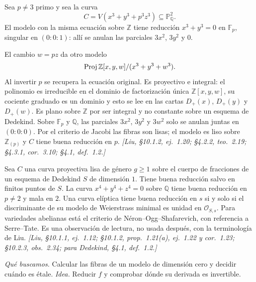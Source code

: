 \begin{ejem}
\label{ejem:s09-modelos-cubica}
Sea $p\ne3$ primo y sea la curva
\[
C=V(x^3+y^3+p^3z^3)\subseteq\mathbb P^2_{\mathbb Q}.
\]
El modelo con la misma ecuación sobre $\mathbb Z$ tiene reducción $x^3+y^3=0$ en $\mathbb F_p$, singular en $(0:0:1)$: allí se anulan las parciales $3x^2$, $3y^2$ y $0$.

El cambio $w=pz$ da otro modelo
\[
\operatorname{Proj}\mathbb Z[x,y,w]/(x^3+y^3+w^3).
\]
Al invertir $p$ se recupera la ecuación original. Es proyectivo e integral: el polinomio es irreducible en el dominio de factorización única $\mathbb Z[x,y,w]$, su cociente graduado es un dominio y esto se lee en las cartas $D_+(x)$, $D_+(y)$ y $D_+(w)$. Es plano sobre $\mathbb Z$ por ser integral y no constante sobre un esquema de Dedekind. Sobre $\mathbb F_p$ y $\mathbb Q$, las parciales $3x^2$, $3y^2$ y $3w^2$ solo se anulan juntas en $(0:0:0)$. Por el criterio de Jacobi las fibras son lisas; el modelo es liso sobre $\mathbb Z_{(p)}$ y $C$ tiene buena reducción en $p$. \emph{[Liu, \S10.1.2, ej.~1.20; \S4.2.2, teo.~2.19; \S4.3.1, cor.~3.10; \S4.1, def.~1.2.]}
\end{ejem}

\begin{obs}
\label{obs:s09-resultados-liu}
Sea $C$ una curva proyectiva lisa de género $g\ge1$ sobre el cuerpo de fracciones de un esquema de Dedekind $S$ de dimensión $1$. Tiene buena reducción salvo en finitos puntos de $S$. La curva $x^4+y^4+z^4=0$ sobre $\mathbb Q$ tiene buena reducción en $p\ne2$ y mala en $2$. Una curva elíptica tiene buena reducción en $s$ si y solo si el discriminante de su modelo de Weierstrass minimal es unidad en $\mathcal O_{S,s}$. Para variedades abelianas está el criterio de Néron--Ogg--Shafarevich, con referencia a Serre--Tate. Es una observación de lectura, no usada después, con la terminología de Liu. \emph{[Liu, \S10.1.1, ej.~1.12; \S10.1.2, prop.~1.21(a), ej.~1.22 y cor.~1.23; \S10.2.3, obs.~2.34; para Dedekind, \S4.1, def.~1.2.]}
\end{obs}

\emph{Qué buscamos.} Calcular las fibras de un modelo de dimensión cero y decidir cuándo es étale. \emph{Idea.} Reducir $f$ y comprobar dónde su derivada es invertible.

